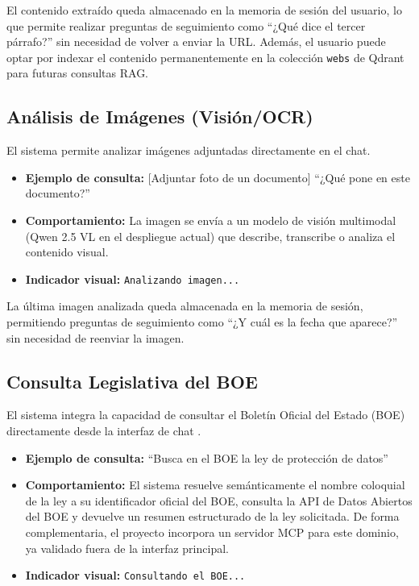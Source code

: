El contenido extraído queda almacenado en la memoria de sesión del usuario, lo que permite realizar preguntas de seguimiento como ``¿Qué dice el tercer párrafo?'' sin necesidad de volver a enviar la URL. Además, el usuario puede optar por indexar el contenido permanentemente en la colección \texttt{webs} de Qdrant para futuras consultas RAG.

\subsection{Análisis de Imágenes (Visión/OCR)}
\label{subsec:modo-vision}

El sistema permite analizar imágenes adjuntadas directamente en el chat.

\begin{itemize}
    \item \textbf{Ejemplo de consulta:} [Adjuntar foto de un documento] ``¿Qué pone en este documento?''
    \item \textbf{Comportamiento:} La imagen se envía a un modelo de visión multimodal (Qwen 2.5 VL en el despliegue actual) que describe, transcribe o analiza el contenido visual.
    \item \textbf{Indicador visual:}  \texttt{Analizando imagen...}
\end{itemize}

La última imagen analizada queda almacenada en la memoria de sesión, permitiendo preguntas de seguimiento como ``¿Y cuál es la fecha que aparece?'' sin necesidad de reenviar la imagen.

\subsection{Consulta Legislativa del BOE}
\label{subsec:modo-boe}

El sistema integra la capacidad de consultar el Boletín Oficial del Estado (BOE) directamente desde la interfaz de chat \cite{boeDatosAbiertos2026}.

\begin{itemize}
    \item \textbf{Ejemplo de consulta:} ``Busca en el BOE la ley de protección de datos''
    \item \textbf{Comportamiento:} El sistema resuelve semánticamente el nombre coloquial de la ley a su identificador oficial del BOE, consulta la API de Datos Abiertos del BOE y devuelve un resumen estructurado de la ley solicitada. De forma complementaria, el proyecto incorpora un servidor MCP para este dominio, ya validado fuera de la interfaz principal.
    \item \textbf{Indicador visual:}  \texttt{Consultando el BOE...}
\end{itemize}

